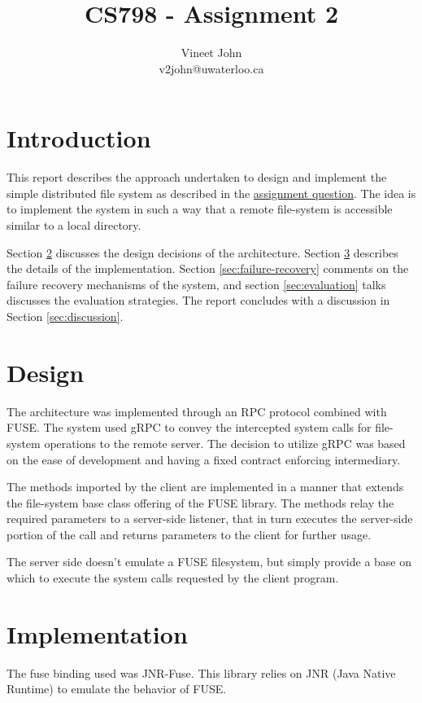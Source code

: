 \documentclass{scrartcl}
\title{CS798 - Assignment 2}
\author{Vineet John\\v2john@uwaterloo.ca}
\begin{document}
\maketitle

\section{Introduction}
This report describes the approach undertaken to design and implement the simple distributed file system as described in the \href{https://cs.uwaterloo.ca/~alkiswan/Classes/CS798/internal/a2.html}{assignment question}. The idea is to implement the system in such a way that a remote file-system is accessible similar to a local directory.

Section \ref{sec:design} discusses the design decisions of the architecture. Section \ref{sec:implementation} describes the details of the implementation. Section \ref{sec:failure-recovery} comments on the failure recovery mechanisms of the system, and section \ref{sec:evaluation} talks discusses the evaluation strategies. The report concludes with a discussion in Section \ref{sec:discussion}.

\section{Design} \label{sec:design}
The architecture was implemented through an RPC protocol combined with FUSE\cite{libfusel7:online}. The system used gRPC\cite{grpcgrpc62:online} to convey the intercepted system calls for file-system operations to the remote server. The decision to utilize gRPC was based on the ease of development and having a fixed contract enforcing intermediary.

The methods imported by the client are implemented in a manner that extends the file-system base class offering of the FUSE library. The methods relay the required parameters to a server-side listener, that in turn executes the server-side portion of the call and returns parameters to the client for further usage.

The server side doesn't emulate a FUSE filesystem, but simply provide a base on which to execute the system calls requested by the client program.

\section{Implementation} \label{sec:implementation}
The fuse binding used was JNR-Fuse\cite{SerCeMan78:online}. This library relies on JNR (Java Native Runtime) to emulate the behavior of FUSE. 
\end{document}
